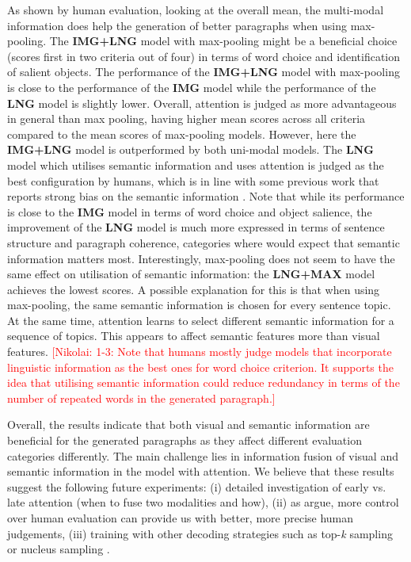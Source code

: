 \documentclass[11pt,a4paper]{article}
\newcommand{\kibitz}[2]{\ifnum\Comments=1\textcolor{#1}{#2}\fi}
\newcommand{\nikolai}[1]{\kibitz{red}  {[Nikolai: #1]}}
\begin{document}
As shown by human evaluation, looking at the overall mean, the multi-modal information does help the generation of better paragraphs when using max-pooling.
The \textbf{IMG+LNG} model with max-pooling might be a beneficial choice (scores first in two criteria out of four) in terms of word choice and identification of salient objects. %
The performance of the \textbf{IMG+LNG} model with max-pooling is close to the performance of the \textbf{IMG} model while the performance of the \textbf{LNG} model is slightly lower.
Overall, attention is judged as more advantageous in general than max pooling, having higher mean scores across all criteria compared to the mean scores of max-pooling models.
However, here the \textbf{IMG+LNG} model is outperformed by both uni-modal models.
The \textbf{LNG} model which utilises semantic information and uses attention is judged as the best configuration by humans, which is in line with some previous work that reports strong bias on the semantic information \cite{Agrawal:2017aa}.
Note that while its performance is close to the \textbf{IMG} model in terms of word choice and object salience, the improvement of the \textbf{LNG} model is much more expressed in terms of sentence structure and paragraph coherence, categories where would expect that semantic information matters most.
Interestingly, max-pooling does not seem to have the same effect on utilisation of semantic information: the \textbf{LNG+MAX} model achieves the lowest scores.
A possible explanation for this is that when using max-pooling, the same semantic information is chosen for every sentence topic.
At the same time, attention learns to select different semantic information for a sequence of topics.
This appears to affect semantic features more than visual features.
\nikolai{1-3: Note that humans mostly judge models that incorporate linguistic information as the best ones for word choice criterion.
It supports the idea that utilising semantic information could reduce redundancy in terms of the number of repeated words in the generated paragraph.}


Overall, the results indicate that both visual and semantic information are beneficial for the generated paragraphs as they affect different evaluation categories differently. The main challenge lies in information fusion of visual and semantic information in the model with attention.
We believe that these results suggest the following future experiments: (i) detailed investigation of early vs. late attention (when to fuse two modalities and how), (ii) as  argue, more control over human evaluation can provide us with better, more precise human judgements, (iii) training with other decoding strategies such as top-\textit{k} sampling or nucleus sampling \cite{Holtzman2019}.
\end{document}
